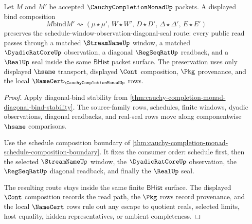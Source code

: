 \begin{theorem}
\label{thm:cauchycompletionmonad-bind-diagonal-route}
Let $M$ and $M'$ be accepted $\CauchyCompletionMonadUp$ packets. A displayed bind composition
$$
M \mathbin{\mathrm{bind}} M' \rightsquigarrow
(\mu \star \mu',\, W \star W',\, D \star D',\, \Delta \star \Delta',\, E \star E')
$$
preserves the schedule-window-observation-diagonal-seal route: every public read passes through a matched $\StreamNameUp$ window, a matched $\DyadicRatCoreUp$ observation, a diagonal $\RegSeqRatUp$ readback, and a $\RealUp$ seal inside the same $\mathsf{BHist}$ packet surface. The preservation uses only displayed $\hsame$ transport, displayed $\Cont$ composition, $\Pkg$ provenance, and the local $\NameCert_{\CauchyCompletionMonadUp}$ rows.
\end{theorem}
\begin{proof}
Apply diagonal-bind stability from \autoref{thm:cauchy-completion-monad-diagonal-bind-stability}. The source-family rows, schedules, finite windows, dyadic observations, diagonal readbacks, and real-seal rows move along componentwise $\hsame$ comparisons.

Use the schedule composition boundary of \autoref{thm:cauchy-completion-monad-schedule-composition-boundary}. It fixes the consumer order: schedule first, then the selected $\StreamNameUp$ window, the $\DyadicRatCoreUp$ observation, the $\RegSeqRatUp$ diagonal readback, and finally the $\RealUp$ seal.

The resulting route stays inside the same finite $\mathsf{BHist}$ surface. The displayed $\Cont$ composition records the read path, the $\Pkg$ rows record provenance, and the local $\NameCert$ rows rule out any escape to quotient reals, selected limits, host equality, hidden representatives, or ambient completeness.
\end{proof}

